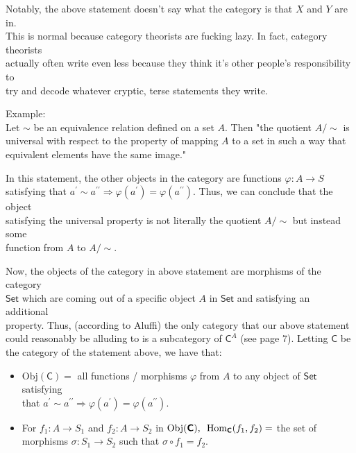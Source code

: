 \documentclass{book}
\newcommand{\exOne}{%
   \color{Purple}%
   \fontsize{14}{16}\selectfont%
}
\newcommand{\exTwo}{%
   \color{RedViolet}%
   \fontsize{13}{15}\selectfont%
}
\newenvironment{myIndent}{%
   \begin{adjustwidth}{2.5em}{0em}%
}{%
   \end{adjustwidth}%
}
\newcommand{\pprime}{{\prime\prime}}
\newcommand{\myHS}{ \hspace{0.5em}}
\newcommand{\myObj}{\mathrm{Obj}}
\newcommand{\myHom}{\mathrm{Hom}}
\newcommand{\mcateg}[1]{{\bm{\mathsf{#1}}}}
\newcommand{\retTwo}{\hfill\bigbreak}
\begin{document}
Notably, the above statement doesn't say what the category is that $X$ and $Y$ are in.\\ This is normal because category theorists are fucking lazy. In fact, category theorists\\ actually often write even less because they think it's other people's responsibility to\\ try and decode whatever cryptic, terse statements they write.\retTwo

\exOne
Example:\\
Let $\sim$ be an equivalence relation defined on a set $A$. Then "the quotient $A/{\sim}$ is\\ universal with respect to the property of mapping $A$ to a set in such a way that\\ equivalent elements have the same image."\retTwo
\begin{myIndent}\exTwo
   In this statement, the other objects in the category are functions $\varphi: A \longrightarrow S$\\ satisfying that $a^\prime \sim a^\pprime \Longrightarrow \varphi(a^\prime) = \varphi(a^\pprime)$. Thus, we can conclude that the object\\ satisfying the universal property is not literally the quotient $A/{\sim}$ but instead some\\ function from $A$ to $A/{\sim}$.\retTwo

   Now, the objects of the category in above statement are morphisms of the category\\ $\mcateg{Set}$ which are coming out of a specific object $A$ in $\mcateg{Set}$ and satisfying an additional\\ property. Thus, (according to Aluffi) the only category that our above statement\\ could reasonably be alluding to is a subcategory of $\mcateg{C}^A$ (see page 7). Letting $\mcateg{C}$ be\\ the category of the statement above, we have that:
   \begin{itemize}
      \item $\myObj(\mcateg{C}) = $ all functions / morphisms $\varphi$ from $A$ to any object of $\mcateg{Set}$ satisfying\\ that $a^\prime \sim a^\pprime \Longrightarrow \varphi(a^\prime) = \varphi(a^\pprime)$.
      
      \item For $f_1: A \rightarrow S_1$ and $f_2: A \rightarrow S_2$ in $\myObj(\mcateg{C}), \myHS \myHom_{\mcateg{C}}(f_1, f_2) = $ the set of\\ morphisms $\sigma: S_1 \rightarrow S_2$ such that $\sigma \circ f_1 = f_2$.\retTwo
   \end{itemize}


\end{myIndent}
\end{document}
